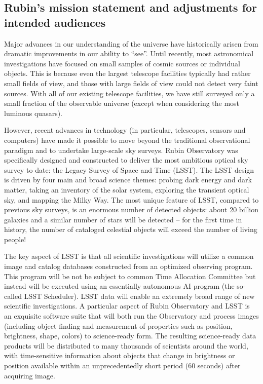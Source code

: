 \subsection{Rubin's mission statement and adjustments for intended audiences}


Major advances in our understanding of the universe have historically arisen from dramatic improvements in our ability to ``see''.
Until recently, most astronomical investigations have focused on small samples of cosmic sources or individual objects. This is because
even the largest telescope facilities typically had rather small fields of view, and those with large fields of view could not detect very faint sources. With all of our existing telescope facilities, we have still surveyed only a small fraction of the observable universe (except when considering the most luminous quasars).

However, recent advances in technology (in particular, telescopes, sensors and computers) have made it possible to move beyond the traditional observational paradigm and to undertake large-scale sky surveys. 
Rubin Observatory was specifically designed and constructed to deliver the most ambitious optical sky survey to date:  the Legacy Survey
of Space and Time (LSST). The LSST design is driven by four main and broad science themes: probing dark energy and dark matter, taking an inventory of the solar system, exploring the transient optical sky, and mapping the Milky Way. The most unique feature of LSST, compared
to previous sky surveys, is an enormous number of detected objects: about 20 billion galaxies and a similar number of stars will be detected -- for the first time in history, the number of cataloged celestial objects will exceed the number of living people! 

The key aspect of LSST is that all scientific investigations will utilize a common image and catalog databases constructed from an optimized observing program. This program will be not be subject to common Time Allocation Committee but instead will be executed using an essentially autonomous AI program (the so-called LSST Scheduler). LSST data will enable an extremely broad range of new scientific investigations. A particular aspect of Rubin Observatory and LSST is an exquisite software suite that will both run the Observatory
and process images (including object finding and measurement of properties such as position, brightness, shape, colors) to science-ready form. The resulting science-ready data products will be distributed to many thousands of scientists around the world, with time-sensitive
information about objects that change in brightness or position available within an unprecedentedly short period (60 seconds) after
acquiring image. 


